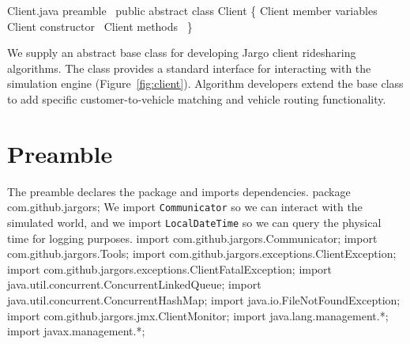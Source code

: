 \nwenddocs{}\endmoddef{}
\LA{}Client.java preamble~{\nwtagstyle{}}\RA{}
public abstract class Client \{
  \LA{}\code{}Client\edoc{} member variables~{\nwtagstyle{}}\RA{}
  \LA{}\code{}Client\edoc{} constructor~{\nwtagstyle{}}\RA{}
  \LA{}\code{}Client\edoc{} methods~{\nwtagstyle{}}\RA{}
\}
\nwendcode{}\nwdocspar

We supply an abstract base class for developing Jargo client ridesharing
algorithms. The class provides a standard interface for interacting with the
simulation engine (Figure~\ref{fig:client}). Algorithm developers extend the
base class to add specific customer-to-vehicle matching and vehicle routing
functionality.

\section{Preamble}
The preamble declares the package and imports dependencies.
\nwenddocs{}\endmoddef{}
package com.github.jargors;
\nwendcode{}\nwdocspar
We import {\tt{}Communicator} so we can interact with the simulated world,
and we import {\tt{}LocalDateTime} so we can query the physical time for
logging purposes.
\nwenddocs{}\plusendmoddef
import com.github.jargors.Communicator;
import com.github.jargors.Tools;
import com.github.jargors.exceptions.ClientException;
import com.github.jargors.exceptions.ClientFatalException;
import java.util.concurrent.ConcurrentLinkedQueue;
import java.util.concurrent.ConcurrentHashMap;
import java.io.FileNotFoundException;
\nwendcode{}\nwdocspar
\nwenddocs{}\plusendmoddef
import com.github.jargors.jmx.ClientMonitor;
import java.lang.management.*;
import javax.management.*;
\nwendcode{}\nwdocspar

